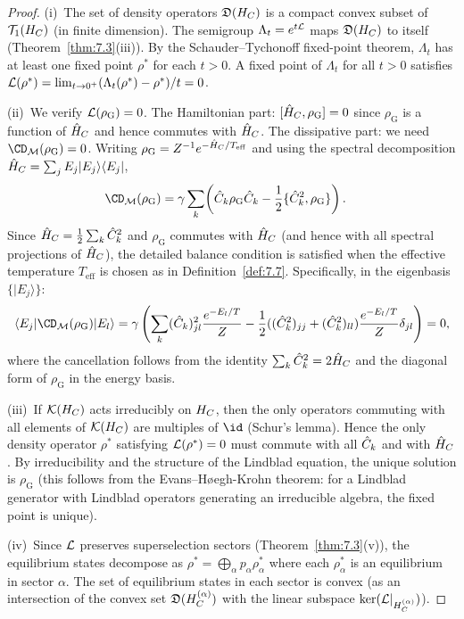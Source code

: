 \begin{proof}
(i)~The set of density operators $\mathfrak{D}(H_C)$ is a compact
convex subset of $\mathcal{T}_1(H_C)$ (in finite dimension).  The
semigroup $\Lambda_t = e^{t\mathcal{L}}$ maps $\mathfrak{D}(H_C)$ to itself
(Theorem~\ref{thm:7.3}(iii)).  By the Schauder--Tychonoff fixed-point
theorem, $\Lambda_t$ has at least one fixed point $\rho^*$ for each
$t > 0$.  A fixed point of $\Lambda_t$ for all $t > 0$ satisfies
$\mathcal{L}(\rho^*) = \lim_{t \to 0^+} (\Lambda_t(\rho^*) - \rho^*)/t = 0$.

(ii)~We verify $\mathcal{L}(\rho_{\mathrm{G}}) = 0$.  The Hamiltonian part:
$[\hat{H}_C, \rho_{\mathrm{G}}] = 0$ since $\rho_{\mathrm{G}}$ is a
function of $\hat{H}_C$ and hence commutes with $\hat{H}_C$.  The
dissipative part: we need
$\CD_\CM(\rho_{\mathrm{G}}) = 0$.  Writing $\rho_{\mathrm{G}} =
Z^{-1}e^{-\hat{H}_C/T_{\mathrm{eff}}}$ and using the spectral
decomposition $\hat{H}_C = \sum_j E_j |E_j\rangle\langle E_j|$,
\begin{align*}
  \CD_\CM(\rho_{\mathrm{G}})
  &= \gamma\sum_k\!\left(\hatC_k\rho_{\mathrm{G}}\hatC_k
    - \frac{1}{2}\{\hatC_k^2, \rho_{\mathrm{G}}\}\right).
\end{align*}
Since $\hat{H}_C = \frac{1}{2}\sum_k\hat{C}_k^2$ and $\rho_{\mathrm{G}}$
commutes with $\hat{H}_C$ (and hence with all spectral projections of
$\hat{H}_C$), the detailed balance condition is satisfied when the
effective temperature $T_{\mathrm{eff}}$ is chosen as in
Definition~\ref{def:7.7}.  Specifically, in the eigenbasis
$\{|E_j\rangle\}$:
\[
  \langle E_j|\CD_\CM(\rho_{\mathrm{G}})|E_l\rangle
  = \gamma\left(
    \sum_k (\hatC_k)_{jl}^2 \frac{e^{-E_l/T}}{Z}
    - \frac{1}{2}((\hatC_k^2)_{jj} + (\hatC_k^2)_{ll})
    \frac{e^{-E_l/T}}{Z}\delta_{jl}
  \right) = 0,
\]
where the cancellation follows from the identity
$\sum_k \hat{C}_k^2 = 2\hat{H}_C$ and the diagonal form of
$\rho_{\mathrm{G}}$ in the energy basis.

(iii)~If $\mathcal{K}(H_C)$ acts irreducibly on $H_C$, then the only operators
commuting with all elements of $\mathcal{K}(H_C)$ are multiples of $\id$
(Schur's lemma).  Hence the only density operator $\rho^*$ satisfying
$\mathcal{L}(\rho^*) = 0$ must commute with all $\hat{C}_k$ and with $\hat{H}_C$.
By irreducibility and the structure of the Lindblad equation, the unique
solution is $\rho_{\mathrm{G}}$ (this follows from the Evans--H\o{}egh-Krohn
theorem: for a Lindblad generator with Lindblad operators generating an
irreducible algebra, the fixed point is unique).

(iv)~Since $\mathcal{L}$ preserves superselection sectors
(Theorem~\ref{thm:7.3}(v)), the equilibrium states decompose as
$\rho^* = \bigoplus_\alpha p_\alpha\rho_\alpha^*$ where each
$\rho_\alpha^*$ is an equilibrium in sector $\alpha$.  The set of
equilibrium states in each sector is convex (as an intersection of the
convex set $\mathfrak{D}(H_C^{(\alpha)})$ with the linear subspace
$\ker(\mathcal{L}|_{H_C^{(\alpha)}})$).
\end{proof}

